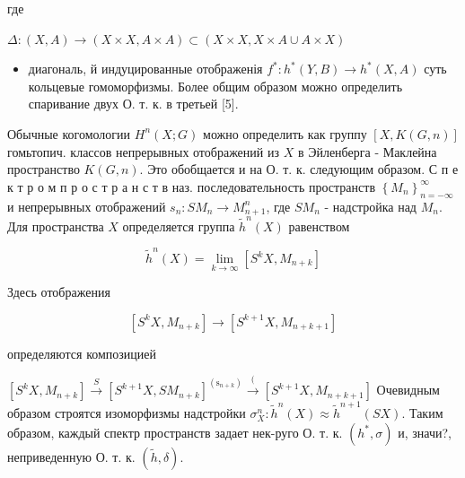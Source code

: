 \documentclass[10pt]{article}
\begin{document}
где



$\Delta:(X, A) \rightarrow(X \times X, A \times A) \subset(X \times X, X \times A \cup A \times X)$



\begin{itemize}

  \item диагональ, й индуцированные отображенія $f^{*}: h^{*}(Y, B) \rightarrow h^{*}(X, A)$ суть кольцевые гомоморфизмы. Более общим образом можно определить спаривание двух О. т. к. в третьей [5].

\end{itemize}



Обычные когомологии $H^{n}(X ; G)$ можно определить как группу $[X, K(G, n)]$ гомьтопич. классов непрерывных отображений из $X$ в Эйленберга - Маклейна пространство $K(G, n)$. Это обобщается и на О. т. к. следующим образом. С п е к т р о м п р о с т р а н с т в наз. последовательность пространств $\left\{M_{n}\right\}_{n=-\infty}^{\infty}$ и непрерывных отображений $s_{n}: S M_{n} \rightarrow M_{n+1}^{n}$, где $S M_{n}$ - надстройка над $M_{n}$. Для пространства $X$ определяется группа $\tilde{h}^{n}(X)$ равенством



\[

\tilde{h}^{n}(X)=\lim _{k \rightarrow \infty}\left[S^{k} X, M_{n+k}\right]

\]



Здесь отображения



\[

\left[S^{k} X, M_{n+k}\right] \rightarrow\left[S^{k+1} X, M_{n+k+1}\right]

\]



определяются композицией



$\left[S^{k} X, M_{n+k}\right] \stackrel{S}{\longrightarrow}\left[S^{k+1} X, S M_{n+k}\right]^{\left(\mathrm{s}_{n+k}\right)} \stackrel{(}{\longrightarrow}\left[S^{k+1} X, M_{n+k+1}\right]$ Очевидным образом строятся изоморфизмы надстройки $\sigma_{X}^{n}: \tilde{h}^{n}(X) \approx \tilde{h}^{n+1}(S X)$. Таким образом, каждый спектр пространств задает нек-руго О. т. к. $\left(h^{*}, \sigma\right)$ и, значи?, неприведенную О. т. к. $(\tilde{h}, \delta)$.
\end{document}
